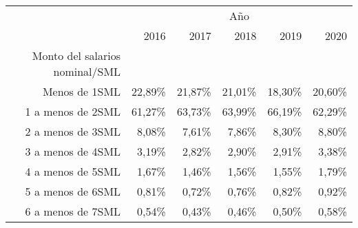 \begin{tabular}{llllll}
\cline{1-6}
\multicolumn{1}{c}{} &
  \multicolumn{5}{|c}{Año} \\
\multicolumn{1}{c}{} &
  \multicolumn{1}{|r}{2016} &
  \multicolumn{1}{r}{2017} &
  \multicolumn{1}{r}{2018} &
  \multicolumn{1}{r}{2019} &
  \multicolumn{1}{r}{2020} \\
\cline{1-6}
\multicolumn{1}{r}{Monto del salarios nominal/SML} &
  \multicolumn{1}{|r}{} &
  \multicolumn{1}{r}{} &
  \multicolumn{1}{r}{} &
  \multicolumn{1}{r}{} &
  \multicolumn{1}{r}{} \\
\multicolumn{1}{r}{Menos de 1SML\hspace{1em}} &
  \multicolumn{1}{|r}{22,89\%} &
  \multicolumn{1}{r}{21,87\%} &
  \multicolumn{1}{r}{21,01\%} &
  \multicolumn{1}{r}{18,30\%} &
  \multicolumn{1}{r}{20,60\%} \\
\multicolumn{1}{r}{1 a menos de 2SML\hspace{1em}} &
  \multicolumn{1}{|r}{61,27\%} &
  \multicolumn{1}{r}{63,73\%} &
  \multicolumn{1}{r}{63,99\%} &
  \multicolumn{1}{r}{66,19\%} &
  \multicolumn{1}{r}{62,29\%} \\
\multicolumn{1}{r}{2 a menos de 3SML\hspace{1em}} &
  \multicolumn{1}{|r}{8,08\%} &
  \multicolumn{1}{r}{7,61\%} &
  \multicolumn{1}{r}{7,86\%} &
  \multicolumn{1}{r}{8,30\%} &
  \multicolumn{1}{r}{8,80\%} \\
\multicolumn{1}{r}{3 a menos de 4SML\hspace{1em}} &
  \multicolumn{1}{|r}{3,19\%} &
  \multicolumn{1}{r}{2,82\%} &
  \multicolumn{1}{r}{2,90\%} &
  \multicolumn{1}{r}{2,91\%} &
  \multicolumn{1}{r}{3,38\%} \\
\multicolumn{1}{r}{4 a menos de 5SML\hspace{1em}} &
  \multicolumn{1}{|r}{1,67\%} &
  \multicolumn{1}{r}{1,46\%} &
  \multicolumn{1}{r}{1,56\%} &
  \multicolumn{1}{r}{1,55\%} &
  \multicolumn{1}{r}{1,79\%} \\
\multicolumn{1}{r}{5 a menos de 6SML\hspace{1em}} &
  \multicolumn{1}{|r}{0,81\%} &
  \multicolumn{1}{r}{0,72\%} &
  \multicolumn{1}{r}{0,76\%} &
  \multicolumn{1}{r}{0,82\%} &
  \multicolumn{1}{r}{0,92\%} \\
\multicolumn{1}{r}{6 a menos de 7SML\hspace{1em}} &
  \multicolumn{1}{|r}{0,54\%} &
  \multicolumn{1}{r}{0,43\%} &
  \multicolumn{1}{r}{0,46\%} &
  \multicolumn{1}{r}{0,50\%} &
  \multicolumn{1}{r}{0,58\%} \\

\end{tabular}
